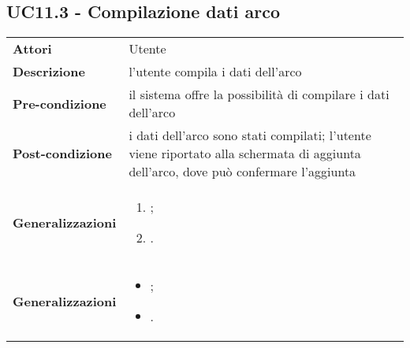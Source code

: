 \subsection{UC11.3 - Compilazione dati arco} 
\label{sssec:UC11.3} 
\def\arraystretch{1.5}
\begin{tabularx}{\textwidth}{l|p{}}
	\rowcolor{I} \multicolumn{2}{c}{\color{white}\textbf{UC11.3 - Compilazione dati arco}} \\
	\toprule
	\endhead
	\textbf{Attori} & Utente\\
	\textbf{Descrizione} & l'utente compila i dati dell'arco\\
	\textbf{Pre-condizione} & il sistema offre la possibilità di compilare i dati dell'arco\\
	\textbf{Post-condizione} & i dati dell'arco sono stati compilati; l'utente viene riportato alla schermata di aggiunta dell'arco, dove può confermare l'aggiunta\\
		\textbf{Generalizzazioni} &
	\vspace{-1.2em}\begin{enumerate}
		[leftmargin=*,noitemsep,nosep]
		\item \nameref{sssec:UC11.4};
		\item \nameref{sssec:UC11.5}.
	\end{enumerate} \\
	\textbf{Generalizzazioni} &
	\vspace{-1.2em}\begin{itemize}
		[leftmargin=*,noitemsep,nosep]
		\item \nameref{sssec:UC11.4};
		\item \nameref{sssec:UC11.5}.
	\end{itemize} \\
	\bottomrule
\end{tabularx}
